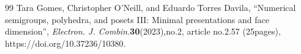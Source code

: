 \documentclass[10pt,a4paper]{amsart}
\begin{document}
\begin{thebibliography}{99}
 Tara Gomes, Christopher O'Neill, and Eduardo Torres Davila, ``Numerical semigroups, polyhedra, and posets III: Minimal presentations and face dimension'', \emph{Electron. J. Combin.}\textbf{30}(2023),no.2, article no.2.57 (25pages), https://doi.org/10.37236/10380.
\end{thebibliography}
\end{document}
